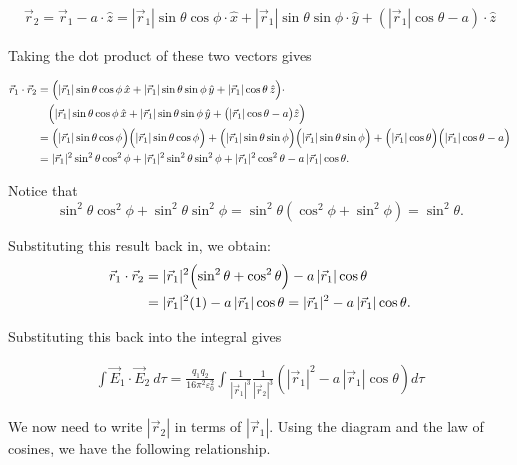 \documentclass{article}
\newcommand{\xvec}{\hat{x}}
\newcommand{\yvec}{\hat{y}}
\newcommand{\zvec}{\hat{z}}
\newcommand{\rvec}[1]{\vec{r}_{#1}}
\begin{document}
\begin{align*}
    \rvec{2} = \rvec{1} - a\cdot \zvec = |\rvec{1}|\sin\theta\cos\phi\cdot\xvec + |\rvec{1}|\sin\theta\sin\phi\cdot\yvec + (|\rvec{1}|\cos\theta - a)\cdot\zvec
\end{align*}

Taking the dot product of these two vectors gives 

\begin{align*}
\vec{r}_1 \cdot \vec{r}_2 
  &= \Bigl(|\vec{r}_1|\sin\theta\cos\phi\,\hat{x} 
      + |\vec{r}_1|\sin\theta\sin\phi\,\hat{y} 
      + |\vec{r}_1|\cos\theta\,\hat{z}\Bigr) \cdot \\
  &\quad\Bigl(|\vec{r}_1|\sin\theta\cos\phi\,\hat{x} 
      + |\vec{r}_1|\sin\theta\sin\phi\,\hat{y} 
      + \bigl(|\vec{r}_1|\cos\theta - a\bigr)\hat{z}\Bigr)\\
  &= \Bigl(|\vec{r}_1|\sin\theta\cos\phi\Bigr)
      \Bigl(|\vec{r}_1|\sin\theta\cos\phi\Bigr) + \Bigl(|\vec{r}_1|\sin\theta\sin\phi\Bigr)
      \Bigl(|\vec{r}_1|\sin\theta\sin\phi\Bigr) + \Bigl(|\vec{r}_1|\cos\theta\Bigr)
      \Bigl(|\vec{r}_1|\cos\theta - a\Bigr) \\
  &= |\vec{r}_1|^2 \sin^2\theta\cos^2\phi 
      + |\vec{r}_1|^2 \sin^2\theta\sin^2\phi + |\vec{r}_1|^2\cos^2\theta - a\,|\vec{r}_1|\cos\theta.
\end{align*}

Notice that
\[
\sin^2\theta\cos^2\phi + \sin^2\theta\sin^2\phi 
  = \sin^2\theta \left(\cos^2\phi + \sin^2\phi\right) 
  = \sin^2\theta.
\]

Substituting this result back in, we obtain:
\begin{align*}
\vec{r}_1 \cdot \vec{r}_2 
  &= |\vec{r}_1|^2 \Bigl(\sin^2\theta + \cos^2\theta\Bigr) 
      - a\,|\vec{r}_1|\cos\theta \\
  &= |\vec{r}_1|^2 (1) - a\,|\vec{r}_1|\cos\theta = |\vec{r}_1|^2 - a\,|\vec{r}_1|\cos\theta.
\end{align*}

Substituting this back into the integral gives 

\begin{align*}
    \int \vec{E}_1 \cdot \vec{E}_2\ d\tau = \frac{q_1q_2}{16\pi^2\varepsilon^2_0} \int \frac{1}{|\vec{r}_1|^3}\frac{1}{|\vec{r}_2|^3} (|\vec{r}_1|^2 - a\,|\vec{r}_1|\cos\theta) d\tau
\end{align*}

We now need to write $|\rvec{2}|$ in terms of $|\rvec{1}|$. Using the diagram and the law of cosines, we have the following relationship.
\end{document}
